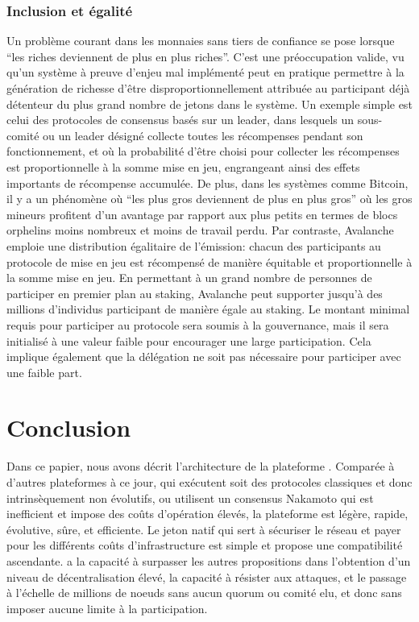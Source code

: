\documentclass[runningheads]{llncs}
\begin{document}
\subsubsection{Inclusion et égalité}
Un problème courant dans les monnaies sans tiers de confiance se pose lorsque ``les riches deviennent de plus en plus
riches''. C'est une préoccupation valide, vu qu'un système à preuve d'enjeu mal implémenté peut en pratique permettre à
la génération de richesse d'être disproportionnellement attribuée au participant déjà détenteur du plus grand nombre de
jetons dans le système. Un exemple simple est celui des protocoles de consensus basés sur un leader, dans lesquels un
sous-comité ou un leader désigné collecte toutes les récompenses pendant son fonctionnement, et où la probabilité d'être
choisi pour collecter les récompenses est proportionnelle à la somme mise en jeu, engrangeant ainsi des effets
importants de récompense accumulée. De plus, dans les systèmes comme Bitcoin, il y a un phénomène où ``les plus gros
deviennent de plus en plus gros'' où les gros mineurs profitent d'un avantage par rapport aux plus petits en termes
de blocs orphelins moins nombreux et moins de travail perdu. Par contraste, Avalanche emploie une distribution
égalitaire de l'émission: chacun des participants au protocole de mise en jeu est récompensé de manière équitable et
proportionnelle à la somme mise en jeu. En permettant à un grand nombre de personnes de participer en premier plan
au staking, Avalanche peut supporter jusqu'à des millions d'individus participant de manière égale au staking. Le
montant minimal requis pour participer au protocole sera soumis à la gouvernance, mais il sera initialisé à une valeur
faible pour encourager une large participation. Cela implique également que la délégation ne soit pas nécessaire pour
participer avec une faible part.

\section{Conclusion}
\label{section:conclusion}
Dans ce papier, nous avons décrit l'architecture de la plateforme \AVAPlatformName{}. Comparée à d'autres plateformes à
ce jour, qui exécutent soit des protocoles classiques et donc intrinsèquement non évolutifs, ou utilisent un consensus
Nakamoto qui est inefficient et impose des coûts d'opération élevés, la plateforme \AVAPlatformName{} est légère, rapide,
évolutive, sûre, et efficiente. Le jeton natif qui sert à sécuriser le réseau et payer pour les différents coûts
d'infrastructure est simple et propose une compatibilité ascendante. \AVATokenName{} a la capacité à surpasser les
autres propositions dans l'obtention d'un niveau de décentralisation élevé, la capacité à résister aux attaques, et le
passage à l'échelle de millions de noeuds sans aucun quorum ou comité elu, et donc sans imposer aucune limite à la
participation.
\end{document}
